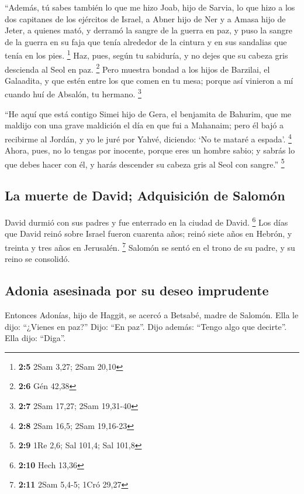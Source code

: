 \begin{paracol}{2}
 ``Además, tú sabes también lo que me hizo Joab, hijo de
Sarvia, lo que hizo a los dos capitanes de los ejércitos de Israel, a
Abner hijo de Ner y a Amasa hijo de Jeter, a quienes mató, y derramó la
sangre de la guerra en paz, y puso la sangre de la guerra en su faja que
tenía alrededor de la cintura y en sus sandalias que tenía en los pies.
\footnote{\textbf{2:5} 2Sam 3,27; 2Sam 20,10}  Haz, pues,
según tu sabiduría, y no dejes que su cabeza gris descienda al Seol en
paz. \footnote{\textbf{2:6} Gén 42,38}  Pero muestra
bondad a los hijos de Barzilai, el Galaadita, y que estén entre los que
comen en tu mesa; porque así vinieron a mí cuando huí de Absalón, tu
hermano. \footnote{\textbf{2:7} 2Sam 17,27; 2Sam 19,31-40}

 ``He aquí que está contigo Simei hijo de Gera, el
benjamita de Bahurim, que me maldijo con una grave maldición el día en
que fui a Mahanaim; pero él bajó a recibirme al Jordán, y yo le juré por
Yahvé, diciendo: `No te mataré a espada'. \footnote{\textbf{2:8} 2Sam
  16,5; 2Sam 19,16-23}  Ahora, pues, no lo tengas por
inocente, porque eres un hombre sabio; y sabrás lo que debes hacer con
él, y harás descender su cabeza gris al Seol con sangre.'' \footnote{\textbf{2:9}
  1Re 2,6; Sal 101,4; Sal 101,8}

\hypertarget{la-muerte-de-david-adquisiciuxf3n-de-salomuxf3n}{%
\subsection{La muerte de David; Adquisición de
Salomón}\label{la-muerte-de-david-adquisiciuxf3n-de-salomuxf3n}}

 David durmió con sus padres y fue enterrado en la ciudad
de David. \footnote{\textbf{2:10} Hech 13,36}  Los días
que David reinó sobre Israel fueron cuarenta años; reinó siete años en
Hebrón, y treinta y tres años en Jerusalén. \footnote{\textbf{2:11} 2Sam
  5,4-5; 1Cró 29,27}  Salomón se sentó en el trono de su
padre, y su reino se consolidó.

\hypertarget{adonia-asesinada-por-su-deseo-imprudente}{%
\subsection{Adonia asesinada por su deseo
imprudente}\label{adonia-asesinada-por-su-deseo-imprudente}}

 Entonces Adonías, hijo de Haggit, se acercó a Betsabé,
madre de Salomón. Ella le dijo: ``¿Vienes en paz?'' Dijo: ``En paz''.
 Dijo además: ``Tengo algo que decirte''. Ella dijo:
``Diga''.


\end{paracol}

